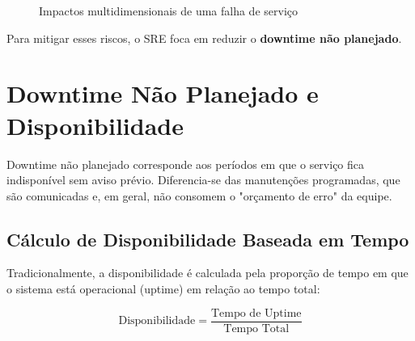 \documentclass[12pt,a4paper]{report}
\begin{document}
\begin{figure}[h]
    \centering
    \caption{Impactos multidimensionais de uma falha de serviço}
    \label{fig:impactos-falha}
\end{figure}

Para mitigar esses riscos, o SRE foca em reduzir o \textbf{downtime não planejado}.

\section{Downtime Não Planejado e Disponibilidade}

Downtime não planejado corresponde aos períodos em que o serviço fica indisponível sem aviso prévio. Diferencia-se das manutenções programadas, que são comunicadas e, em geral, não consomem o "orçamento de erro" da equipe.

\subsection{Cálculo de Disponibilidade Baseada em Tempo}

Tradicionalmente, a disponibilidade é calculada pela proporção de tempo em que o sistema está operacional (uptime) em relação ao tempo total:

\begin{equation}
\text{Disponibilidade} = \frac{\text{Tempo de Uptime}}{\text{Tempo Total}}
\end{equation}
\end{document}
